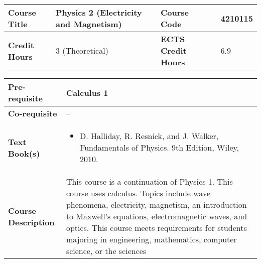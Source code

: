 \documentclass[12pt]{article}
\begin{document}
\begin{minipage}{\textwidth}
\begin{tabularx}{\textwidth}{|l|X|l|X|}
\hline
\textbf{Course Title}       &   Physics 2 (Electricity and Magnetism) & \textbf{Course Code}       &  4210115 \\ \hline
\textbf{Credit Hours}       &   3 (Theoretical) & \textbf{ECTS Credit Hours}       &   6.9 \\ \hline
\end{tabularx}

\begin{tabularx}{\textwidth}{|l|X|}
\hline
\textbf{Pre-requisite}      &  Calculus 1 \\ \hline
\textbf{Co-requisite}       &  -- \\ \hline
\textbf{Text Book(s)}      & \begin{minipage}{.70\textwidth}
					\begin{itemize} \itemsep-0.4em
						\vspace{3mm}
						\item D. Halliday, R. Resnick, and J. Walker, Fundamentals of Physics. 9th Edition, Wiley, 2010.
						\vspace{3mm}
					\end{itemize}
				\end{minipage}  \\ \hline
\textbf{Course Description} & \begin{minipage}{.70\textwidth}
					\vspace{3mm}
					
This course is a continuation of Physics 1.  This course uses calculus. Topics include wave phenomena, electricity, magnetism, an introduction to Maxwell's equations, electromagnetic waves, and optics. This course meets requirements for students majoring in engineering, mathematics, computer science, or the sciences
					\vspace{3mm}
					\end{minipage} \\ \hline
\end{tabularx}
\end{minipage}

\bigskip
\bigskip
\end{document}
